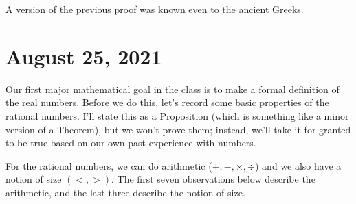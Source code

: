 \documentclass[12pt]{amsart}
\numberwithin{equation}{section}
\theoremstyle{plain} %
\newcommand{\Aug}[1]{\section{August #1, 2021}}
\theoremstyle{definition}
\theoremstyle{remark}
\begin{document}
A version of the previous proof was known even to the ancient Greeks.




\Aug{25}

Our first major mathematical goal in the class is to make a formal definition of the real numbers. 
Before we do this, let's record some basic properties of the rational numbers. I'll state this as a Proposition (which is something like a minor version of a Theorem), but we won't prove them; instead, we'll take it for granted to be true based on our own past experience with numbers.

For the rational numbers, we can do arithmetic ($+,-,\times,\div$) and we also have a notion of size $(<,>)$. The first seven observations below describe the arithmetic, and the last three describe the notion of size.
\end{document}
